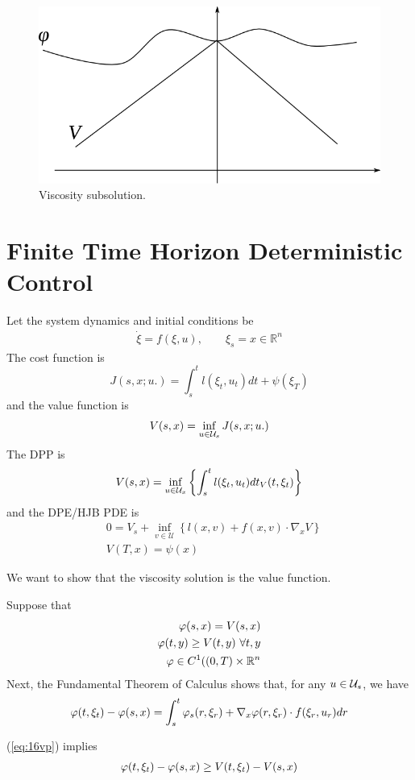 \begin{figure}[ht!]
	\centering
	\includegraphics[width=.4\textwidth]{images/16subsol}
	\caption{Viscosity subsolution.}
	\label{fig:16subsol}
\end{figure}

\section{Finite Time Horizon Deterministic Control}
Let the system dynamics and initial conditions be
\begin{align*}
\dot{\xi} = f(\xi,u), \qquad \xi_s=x\in\mathbb{R}^n
\end{align*}
The cost function is
$$J(s,x;u.) = \int_s^tl(\xi_t,u_t)dt+\psi(\xi_T)$$
and the value function is
$$V(s,x) = \inf_{u\in\mathcal{U}_s}J(s,x;u.)$$
The DPP is
$$V(s,x) = \inf_{u\in\mathcal{U}_x}\left\lbrace \int_s^tl(\xi_t,u_t)dt_V(t,\xi_t) \right\rbrace$$
and the DPE/HJB PDE is
\begin{align}
\label{eq:16dpe}
&0 = V_s + \inf_{v\in\mathcal{U}}\left\lbrace l(x,v)+f(x,v)\cdot\nabla_xV\right\rbrace \\
&V(T,x) = \psi(x) \nonumber
\end{align}

We want to show that the viscosity solution is the value function.

Suppose that
\begin{align}
\label{eq:16vp}
\begin{split}
\varphi(s,x)=V(s,x) \\
\varphi(t,y)\geq V(t,y) ~\forall t,y \\
\varphi\in C^1((0,T)\times\mathbb{R}^n
\end{split}
\end{align}
Next, the Fundamental Theorem of Calculus shows that, for any $u\in\mathcal{U}_s$, we have
\begin{align}
\label{eq:16fund}
\varphi(t,\xi_t)-\varphi(s,x) = \int_s^t\varphi_s(r,\xi_r)+\nabla_x\varphi(r,\xi_r)\cdot f(\xi_r,u_r)dr
\end{align}

(\ref{eq:16vp}) implies
\begin{align}
\label{eq:16vpv}
\varphi(t,\xi_t)-\varphi(s,x)\geq V(t,\xi_t)-V(s,x)
\end{align}

